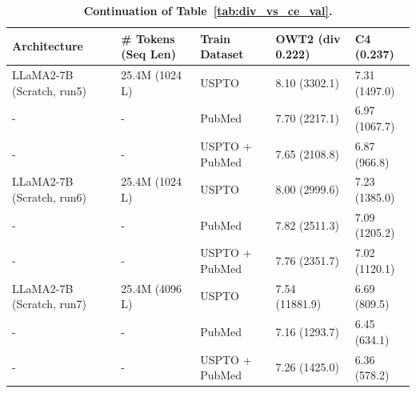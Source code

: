 \begin{table}[h]
\caption{\textbf{Continuation of Table~\ref{tab:div_vs_ce_val}.}}
\vspace{10pt}
\centering
\begin{tabularx}{1\textwidth}{lXXXX} 
\bottomrule 
Architecture & \# Tokens (Seq Len) & Train Dataset  & OWT2 (\textbf{div 0.222})  & C4 (\textbf{0.237}) \\
\bottomrule 
LLaMA2-7B (Scratch, run5) & 25.4M (1024 L) & USPTO  & 8.10 (3302.1) & 7.31 (1497.0) \\ %
- & - & PubMed & 7.70 (2217.1) & 6.97 (1067.7) \\ %
- & - & USPTO + PubMed & 7.65 (2108.8) & 6.87 (966.8) \\ %
\hline
LLaMA2-7B (Scratch, run6) & 25.4M  (1024 L) & USPTO  & 8.00 (2999.6) & 7.23 (1385.0) \\ %
- & - & PubMed & 7.82 (2511.3) & 7.09 (1205.2) \\ %
- & - & USPTO + PubMed & 7.76 (2351.7) & 7.02 (1120.1) \\ %
\hline

LLaMA2-7B (Scratch, run7) & 25.4M (4096 L) & USPTO  & 7.54 (11881.9) & 6.69 (809.5) \\ %
- & - & PubMed & 7.16 (1293.7) & 6.45 (634.1) \\ %
- & - & USPTO + PubMed & 7.26 (1425.0) & 6.36 (578.2) \\ %
\hline



\end{tabularx}
\end{table}
